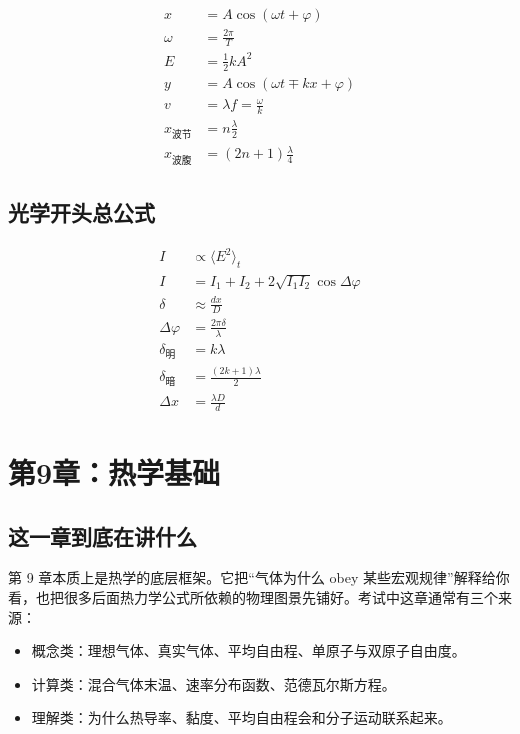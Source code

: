 \documentclass[12pt,a4paper]{article}
\begin{document}
\begin{align*}
x &= A\cos(\omega t+\varphi) \\
\omega &= \frac{2\pi}{T} \\
E &= \frac12 kA^2 \\
y &= A\cos(\omega t \mp kx + \varphi) \\
v &= \lambda f = \frac{\omega}{k} \\
x_{\text{波节}} &= n\frac{\lambda}{2} \\
x_{\text{波腹}} &= (2n+1)\frac{\lambda}{4}
\end{align*}

\subsection{光学开头总公式}

\begin{align*}
I &\propto \langle E^2\rangle_t \\
I &= I_1 + I_2 + 2\sqrt{I_1I_2}\cos\Delta\varphi \\
\delta &\approx \frac{dx}{D} \\
\Delta\varphi &= \frac{2\pi\delta}{\lambda} \\
\delta_{\text{明}} &= k\lambda \\
\delta_{\text{暗}} &= \frac{(2k+1)\lambda}{2} \\
\Delta x &= \frac{\lambda D}{d}
\end{align*}

\section{第9章：热学基础}

\subsection{这一章到底在讲什么}

第 9 章本质上是热学的底层框架。它把“气体为什么 obey 某些宏观规律”解释给你看，也把很多后面热力学公式所依赖的物理图景先铺好。考试中这章通常有三个来源：

\begin{itemize}
  \item 概念类：理想气体、真实气体、平均自由程、单原子与双原子自由度。
  \item 计算类：混合气体末温、速率分布函数、范德瓦尔斯方程。
  \item 理解类：为什么热导率、黏度、平均自由程会和分子运动联系起来。
\end{itemize}
\end{document}
